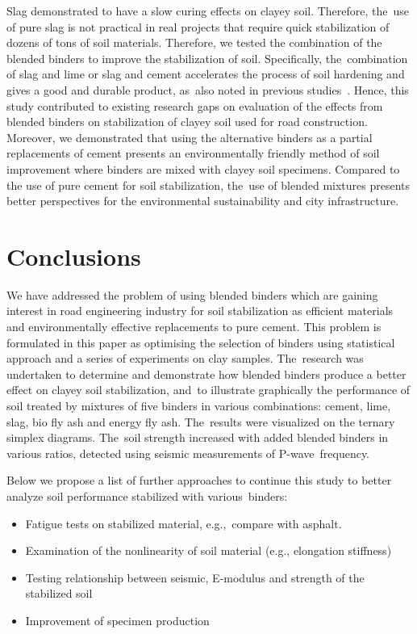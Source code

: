 \documentclass[constrmater,article,accept,pdftex,moreauthors]{Definitions/mdpi}
\begin{document}
{Slag demonstrated to have} a slow curing {effects on clayey soil. Therefore, the~use of pure slag} is not practical{ }in real projects that require {quick stabilization of} dozens of tons of {soil }materials. Therefore, we tested the combination of the blended binders to improve the stabilization of soil. Specifically, the~combination of slag and lime or slag and cement accelerates the process of soil hardening and gives a good and durable product, as~also noted in previous studies~\cite{Lindh2021a}. Hence, this study {contributed to} existing research {gaps} on {evaluation of the effects from }blended binders {on stabilization of }clayey soil {used for }road construction{. Moreover, we demonstrated that using the alternative binders as a partial replacements of cement presents an environmentally friendly method of soil improvement where binders are mixed with clayey soil specimens. Compared to the use of pure cement for soil stabilization, the~use of blended mixtures presents better perspectives for the environmental sustainability and city infrastructure.}

\section{Conclusions}

We have addressed the problem of using blended binders which are gaining interest in road engineering industry for soil stabilization as efficient materials and environmentally effective replacements to pure cement. This problem is formulated in this paper as optimising the selection of binders using statistical approach and a series of experiments on clay samples. The~research was undertaken to determine and demonstrate how blended binders produce a better effect on clayey soil stabilization, and~to illustrate graphically the performance of soil treated by mixtures of five binders in various combinations: cement, lime, slag, bio fly ash and energy fly ash. The~results were visualized on the ternary simplex diagrams. The~soil strength increased with added blended binders in various ratios, detected using seismic measurements of P-wave~frequency. 

Below we propose a list of further approaches to continue this study to better analyze soil performance stabilized with various~binders:
\begin{itemize}
	\item	Fatigue tests on stabilized material, e.g.,~compare with asphalt. 
	\item Examination of the nonlinearity of soil material (e.g., elongation stiffness)
	\item Testing relationship between seismic, E-modulus and strength of the stabilized soil
	\item Improvement of specimen production
\end{itemize}
\end{document}
